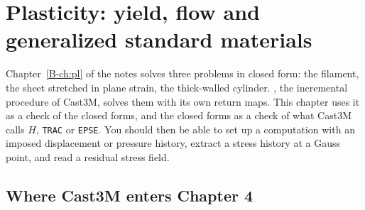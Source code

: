 \chapter{Plasticity: yield, flow and generalized standard materials}\label{cc:ch4}


Chapter~\ref{B-ch:pl} of the notes solves three problems in closed form: the
filament, the sheet stretched in plane strain, the thick-walled cylinder.
, the incremental procedure of Cast3M, solves them with its own
return maps. This chapter uses it as a check of the closed forms, and the
closed forms as a check of what Cast3M calls $H$, \texttt{TRAC} or
\texttt{EPSE}. You should then be able to set up a  computation
with an imposed displacement or pressure history, extract a stress history at
a Gauss point, and read a residual stress field.

\section{Where Cast3M enters Chapter 4}\label{cc:sec4-map}
%

